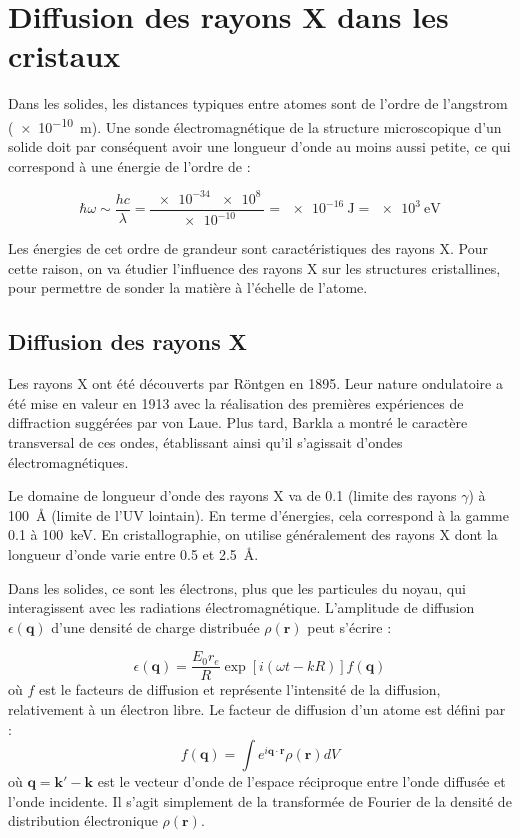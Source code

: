 \chapter{Diffusion des rayons X dans les cristaux}

Dans les solides, les distances typiques entre atomes sont de l'ordre de 
l'angstrom (\SI{e-10}{\metre}). Une sonde électromagnétique de la structure
microscopique d'un solide doit par conséquent avoir une longueur d'onde au
moins aussi petite, ce qui correspond à une énergie de l'ordre de :

\begin{equation}
\hbar \omega \sim \frac{hc}{\lambda} = \frac{\SI{e-34}{}\SI{e8}{}}{\SI{e-10}{}} = \SI{e-16}{\joule} = \SI{e3}{\electronvolt}
\end{equation}

Les énergies de cet ordre de grandeur sont caractéristiques des rayons X. Pour 
cette raison, on va étudier l'influence des rayons X sur les structures
cristallines, pour permettre de sonder la matière à l'échelle de l'atome.


\section{Diffusion des rayons X}

Les rayons X ont été découverts par Röntgen en 1895. Leur nature ondulatoire a
été mise en valeur en 1913 avec la réalisation des premières expériences de
diffraction suggérées par von Laue. Plus tard, Barkla a montré le caractère
transversal de ces ondes, établissant ainsi qu'il s'agissait d'ondes
électromagnétiques.

Le domaine de longueur d'onde des rayons X va de 0.1 (limite des rayons
$\gamma$) à \SI{100}{\angstrom} (limite de l'UV lointain). En terme d'énergies,
cela correspond à la gamme 0.1 à \SI{100}{\kilo\electronvolt}. En
cristallographie, on utilise généralement des rayons X dont la longueur d'onde 
varie entre 0.5 et \SI{2.5}{\angstrom}.

Dans les solides, ce sont les électrons, plus que les particules du noyau, qui
interagissent avec les radiations électromagnétique. L'amplitude de diffusion
$\epsilon(\mathbf{q})$ d'une densité de charge distribuée $\rho(\mathbf{r})$ peut
s'écrire :

\begin{equation}
    \epsilon(\mathbf{q}) = \frac{E_0 r_e}{R} \exp [i(\omega t - k R)] f(\mathbf{q})
\end{equation}
où $f$ est le facteurs de diffusion et représente l'intensité de la diffusion,
relativement à un électron libre. Le facteur de diffusion d'un atome est défini
par :
\begin{equation}
    f(\mathbf{q}) = \int e^{i\mathbf{q}\cdot\mathbf{r}} \rho(\mathbf{r}) dV
\end{equation}
où $\mathbf{q = k' - k}$ est le vecteur d'onde de l'espace réciproque entre
l'onde diffusée et l'onde incidente. Il s'agit simplement de la transformée de
Fourier de la densité de distribution électronique $\rho(\mathbf{r})$.

